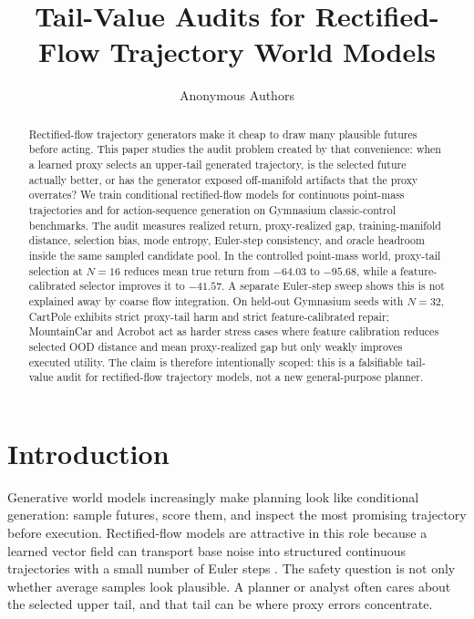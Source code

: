 \documentclass[10pt]{article}
\title{Tail-Value Audits for Rectified-Flow Trajectory World Models}
\author{Anonymous Authors}
\date{}
\begin{document}
\maketitle

\begin{abstract}
Rectified-flow trajectory generators make it cheap to draw many plausible futures before acting. This paper studies the audit problem created by that convenience: when a learned proxy selects an upper-tail generated trajectory, is the selected future actually better, or has the generator exposed off-manifold artifacts that the proxy overrates? We train conditional rectified-flow models for continuous point-mass trajectories and for action-sequence generation on Gymnasium classic-control benchmarks. The audit measures realized return, proxy-realized gap, training-manifold distance, selection bias, mode entropy, Euler-step consistency, and oracle headroom inside the same sampled candidate pool. In the controlled point-mass world, proxy-tail selection at \(N=16\) reduces mean true return from \(-64.03\) to \(-95.68\), while a feature-calibrated selector improves it to \(-41.57\). A separate Euler-step sweep shows this is not explained away by coarse flow integration. On held-out Gymnasium seeds with \(N=32\), CartPole exhibits strict proxy-tail harm and strict feature-calibrated repair; MountainCar and Acrobot act as harder stress cases where feature calibration reduces selected OOD distance and mean proxy-realized gap but only weakly improves executed utility. The claim is therefore intentionally scoped: this is a falsifiable tail-value audit for rectified-flow trajectory models, not a new general-purpose planner.
\end{abstract}

\section{Introduction}

Generative world models increasingly make planning look like conditional generation: sample futures, score them, and inspect the most promising trajectory before execution. Rectified-flow models are attractive in this role because a learned vector field can transport base noise into structured continuous trajectories with a small number of Euler steps \cite{lipman2023,liu2023}. The safety question is not only whether average samples look plausible. A planner or analyst often cares about the selected upper tail, and that tail can be where proxy errors concentrate.
\end{document}
